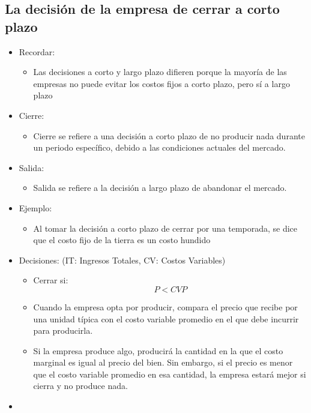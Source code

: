 \documentclass{article}
\begin{document}
\subsection{La decisión de la empresa de cerrar a corto plazo}
\begin{itemize}
    \item Recordar:
        \begin{itemize}
            \item Las decisiones a corto y largo plazo difieren porque la mayoría de las empresas no puede evitar los costos fijos a corto plazo, pero sí a largo plazo
        \end{itemize}
    
    \item Cierre: 
        \begin{itemize}
            \item Cierre se refiere a una decisión a corto plazo de no producir nada durante un periodo específico, debido a las condiciones actuales del mercado.
        \end{itemize}
    
    \item Salida:
        \begin{itemize}
            \item  Salida se refiere a la decisión a largo plazo de abandonar el mercado.
        \end{itemize}
    
    \item Ejemplo:
        \begin{itemize}
            \item Al tomar la decisión a corto plazo de cerrar por una temporada, se dice que el costo fijo de la tierra es un costo hundido
        \end{itemize}
    
    \item Decisiones: (IT: Ingresos Totales, CV: Costos Variables)
        \begin{itemize}
            \item Cerrar si: 
                \[
                  P < CVP
                \]
            
            \item  Cuando la empresa opta por producir, compara el precio que recibe por una unidad típica con el costo variable promedio en el que debe incurrir para producirla.
            \item Si la empresa produce algo, producirá la cantidad en la que el costo marginal es igual al precio del bien. Sin embargo, si el precio es menor que el costo variable promedio en esa cantidad, la empresa estará mejor si cierra y no produce nada. 
        \end{itemize}
    
    \item {} 
\end{itemize}
\end{document}

